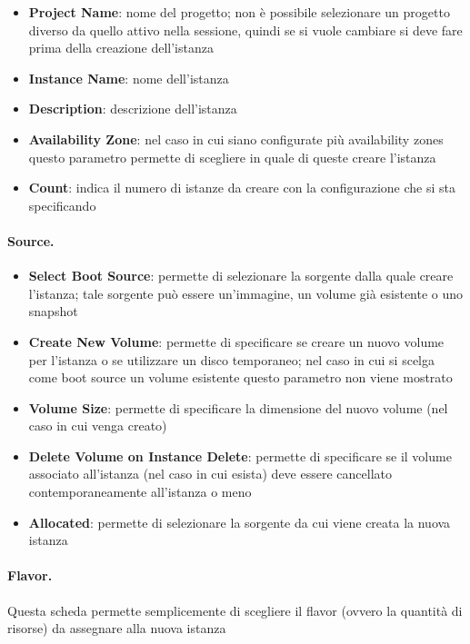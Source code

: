 \begin{itemize}
    \item \textbf{Project Name}: nome del progetto; non è possibile selezionare un progetto diverso da quello attivo nella sessione, quindi se si vuole cambiare si deve fare prima della creazione dell'istanza
    \item \textbf{Instance Name}: nome dell'istanza
    \item \textbf{Description}: descrizione dell'istanza
    \item \textbf{Availability Zone}: nel caso in cui siano configurate più availability zones questo parametro permette di scegliere in quale di queste creare l'istanza
    \item \textbf{Count}: indica il numero di istanze da creare con la configurazione che si sta specificando
\end{itemize}

\paragraph{Source.}
\begin{itemize}
    \item \textbf{Select Boot Source}: permette di selezionare la sorgente dalla quale creare l'istanza; tale sorgente può essere un'immagine, un volume già esistente o uno snapshot
    \item \textbf{Create New Volume}: permette di specificare se creare un nuovo volume per l'istanza o se utilizzare un disco temporaneo; nel caso in cui si scelga come boot source un volume esistente questo parametro non viene mostrato
    \item \textbf{Volume Size}: permette di specificare la dimensione del nuovo volume (nel caso in cui venga creato)
    \item \textbf{Delete Volume on Instance Delete}: permette di specificare se il volume associato all'istanza (nel caso in cui esista) deve essere cancellato contemporaneamente all'istanza o meno
    \item \textbf{Allocated}: permette di selezionare la sorgente da cui viene creata la nuova istanza
\end{itemize}

\paragraph{Flavor.}
Questa scheda permette semplicemente di scegliere il flavor (ovvero la quantità di risorse) da assegnare alla nuova istanza


